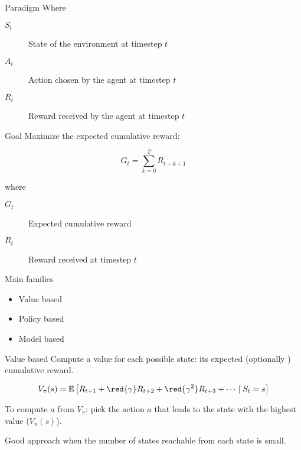 \begin{frame}{Paradigm}
  Where

  \begin{description}
    \item[$S_t$] State of the environment at timestep $t$
    \item[$A_t$] Action chosen by the agent at timestep $t$
    \item[$R_t$] Reward received by the agent at timestep $t$
  \end{description}
\end{frame}

\begin{frame}{Goal}
  Maximize the expected cumulative reward:

  \[
    G_t = \sum_{k=0}^T R_{t+k+1}
  \]

  where

  \begin{description}
    \item[$G_t$] Expected cumulative reward
    \item[$R_t$] Reward received at timestep $t$
  \end{description}
\end{frame}

\begin{frame}{Main families}
  \begin{itemize}
    \item Value based
    \item Policy based
    \item Model based
  \end{itemize}
\end{frame}

\begin{frame}{Value based}
  Compute a value for each possible state: its expected (optionally ) cumulative reward.

  \[
    V_\pi(s) = \mathbb{E}\left[
      R_{t + 1}
      + \red{\gamma} R_{t + 2}
      + \red{\gamma^2} R_{t + 3}
      + \dots
      \mid S_t = s
    \right]
  \]

  \pause

  To compute $a$ from $V_\pi$: pick the action $a$ that leads to the state with the highest value ($V_\pi(s)$).

  \pause

  Good approach when the number of states reachable from each state is small.
\end{frame}

